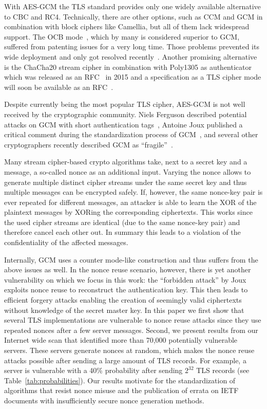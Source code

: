 With AES-GCM the TLS standard provides only one widely available alternative to CBC and RC4.
Technically, there are other options, such as CCM and GCM in combination with block ciphers like Camellia, but all of them lack widespread support.
The OCB mode~\cite{krovetz2011}, which by many is considered superior to GCM, suffered from patenting issues for a very long time. Those problems prevented its wide deployment and only got resolved recently~\cite{draft-ocb-zauner}.
Another promising alternative is the ChaCha20 stream cipher in combination with Poly1305 as authenticator which was released as an RFC~\cite{rfc7539} in 2015
and a specification as a TLS cipher mode will soon be available as an RFC~\cite{draft-chacha-langely}.

Despite currently being the most popular TLS cipher, AES-GCM is not well received by the cryptographic community. Niels Ferguson described potential
attacks on GCM with short authentication tags~\cite{ferguson2005}, Antoine Joux published a
critical comment during the standardization process of GCM~\cite{joux2007}, and several other cryptographers recently described GCM as ``fragile''~\cite{gcm-kenny,6822219}.

Many stream cipher-based crypto algorithms take, next to a secret key and a
message, a so-called nonce as an additional input. Varying the nonce allows to
generate multiple distinct cipher streams under the same secret key and thus
multiple messages can be encrypted safely. If, however, the same nonce-key pair
is ever repeated for different messages, an attacker is able to learn the XOR of
the plaintext messages by XORing the corresponding ciphertexts. This works since
the used cipher streams are identical (due to the same nonce-key pair) and
therefore cancel each other out. In summary this leads to a violation of the
confidentiality of the affected messages.

Internally, GCM uses a counter mode-like construction and thus suffers from the
above issues as well. In the nonce reuse scenario, however, there is yet another
vulnerability on which we focus in this work:
the ``forbidden attack'' by Joux~\cite{joux2007} exploits nonce reuse to reconstruct the authentication key.
This then leads to efficient forgery attacks enabling the creation of seemingly valid ciphertexts without knowledge of the secret master key.
In this paper we first show that several TLS implementations are vulnerable to nonce reuse attacks since they use repeated nonces after a few server messages.
Second, we present results from our Internet wide scan that identified more than 70,000 potentially vulnerable servers. 
These servers generate nonces at random, which makes the nonce reuse attacks possible after sending a large amount of TLS records. For example, a server is vulnerable with a 40\% probability after sending $2^{32}$ TLS records (see Table~\ref{tab:probabilities}).
Our results motivate for the standardization of algorithms that resist nonce misuse and the publication of errata on IETF documents with insufficiently secure nonce generation methods.




